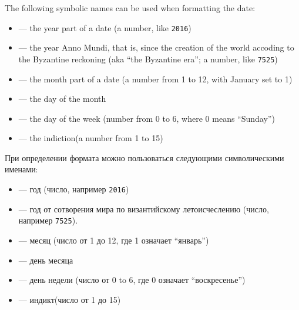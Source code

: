 \begin{EN}
The following symbolic names can be used when formatting the date:
\begin{itemize}
\item {} --- the year part of a date (a number, like \texttt{2016})
\item {}\footnotemark[1] --- the year Anno Mundi, that is, since the creation of the world accoding to the Byzantine reckoning (aka ``the Byzantine era''; a number, like \texttt{7525})
\item {} --- the month part of a date (a number from 1 to 12, with January set to 1)
\item {} --- the day of the month
\item {}\footnotemark[1] --- the day of the week (number from 0 to 6, where 0 means ``Sunday'')
\item {} --- the indiction\footnotemark[2] (a number from 1 to 15)
\end{itemize}

\end{EN}

\begin{RU}
При определении формата можно пользоваться следующими символическими именами:
\begin{itemize}
\item {} --- год (число, например \texttt{2016})
\item {}\footnotemark[1] --- год от сотворения мира по византийскому летоисчеслению (число, например \texttt{7525}).
\item {} --- месяц (число от 1 до 12, где 1 означает ``январь'')
\item {} --- день месяца
\item {}\footnotemark[1] --- день недели (число от 0 to 6, где 0 означает ``воскресенье'')
\item {} --- индикт\footnotemark[2] (число от 1 до 15)
\end{itemize}
\end{RU}

